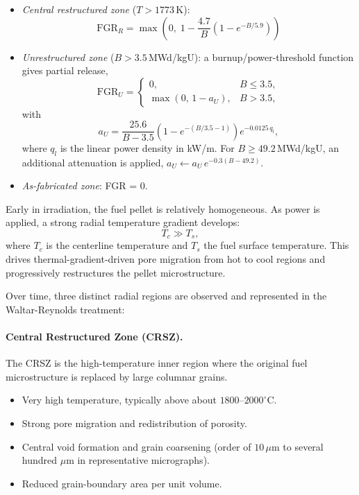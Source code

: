 \begin{refsection}
\begin{itemize}
\item \emph{Central restructured zone} ($T > 1773$\,K):
        \begin{equation}
          \text{FGR}_R = \max\!\left(0,\;
          1 - \frac{4.7}{B}\left(1 - e^{-B/5.9}\right)\right)
          \label{eq:fgr_restructured}
        \end{equation}
\item \emph{Unrestructured zone} ($B > 3.5$\,MWd/kgU): a burnup/power-threshold function gives partial release,
        \begin{equation}
          \mathrm{FGR}_U =
          \begin{cases}
            0, & B \le 3.5, \\
            \max\!\left(0,\,1-a_U\right), & B > 3.5,
          \end{cases}
        \end{equation}
with
        \begin{equation}
          a_U = \frac{25.6}{B-3.5}
                \left(1-e^{-(B/3.5-1)}\right)
                e^{-0.0125\,q_l},
        \end{equation}
where $q_l$ is the linear power density in kW/m. For $B\ge 49.2$\,MWd/kgU, an additional attenuation is applied, $a_U \leftarrow a_U\,e^{-0.3(B-49.2)}$.
\item \emph{As-fabricated zone}: FGR = 0.
\end{itemize}

Early in irradiation, the fuel pellet is relatively homogeneous. As power is applied, a strong radial temperature gradient develops:
\begin{equation}
  T_c \gg T_s,
\end{equation}
where $T_c$ is the centerline temperature and $T_s$ the fuel surface temperature. This drives thermal-gradient-driven pore migration from hot to cool regions and progressively restructures the pellet microstructure.

Over time, three distinct radial regions are observed and represented in the Waltar-Reynolds treatment:

\paragraph{Central Restructured Zone (CRSZ).} The CRSZ is the high-temperature inner region where the original fuel microstructure is replaced by large columnar grains.

\begin{itemize}
\item Very high temperature, typically above about $1800$--$2000^{\circ}$C.
\item Strong pore migration and redistribution of porosity.
\item Central void formation and grain coarsening (order of $10\,\mu$m to several hundred $\mu$m in representative micrographs).
\item Reduced grain-boundary area per unit volume.
\end{itemize}


\end{refsection}
